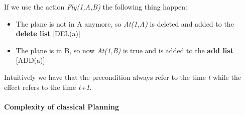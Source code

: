 \documentclass[5pt,a4paper]{article}
\begin{document}
If we use the action \textit{Fly(1,A,B)} the following thing happen:

\begin{itemize}
\item The plane is not in A anymore, so \textit{At(1,A)} is deleted and added to the \textbf{delete list} [DEL(a)]
\item The plane is in B, so now \textit{At(1,B)} is true and is added to the \textbf{add list} [ADD(a)]
\end{itemize}

Intuitively we have that the precondition always refer to the time \textit{t} while the effect refers to the time \textit{t+1}.

\paragraph{Complexity of classical Planning}
\end{document}
